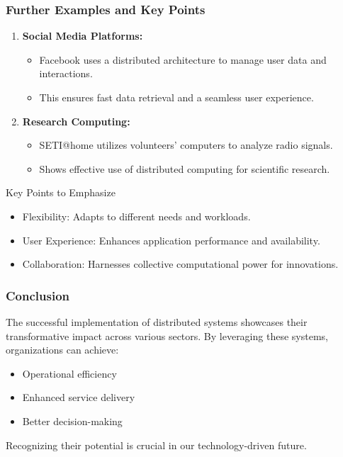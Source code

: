 \documentclass[aspectratio=169]{beamer}
\begin{document}
\begin{frame}[fragile]
    \frametitle{Further Examples and Key Points}
    \begin{enumerate}
        \item \textbf{Social Media Platforms:}
            \begin{itemize}
                \item Facebook uses a distributed architecture to manage user data and interactions.
                \item This ensures fast data retrieval and a seamless user experience.
            \end{itemize}
            
        \item \textbf{Research Computing:}
            \begin{itemize}
                \item SETI@home utilizes volunteers' computers to analyze radio signals.
                \item Shows effective use of distributed computing for scientific research.
            \end{itemize}
    \end{enumerate}

    \begin{block}{Key Points to Emphasize}
        \begin{itemize}
            \item Flexibility: Adapts to different needs and workloads.
            \item User Experience: Enhances application performance and availability.
            \item Collaboration: Harnesses collective computational power for innovations.
        \end{itemize}
    \end{block}
\end{frame}

\begin{frame}[fragile]
    \frametitle{Conclusion}
    The successful implementation of distributed systems showcases their transformative impact across various sectors. By leveraging these systems, organizations can achieve:
    \begin{itemize}
        \item Operational efficiency
        \item Enhanced service delivery
        \item Better decision-making
    \end{itemize}
    Recognizing their potential is crucial in our technology-driven future.
\end{frame}
\end{document}

